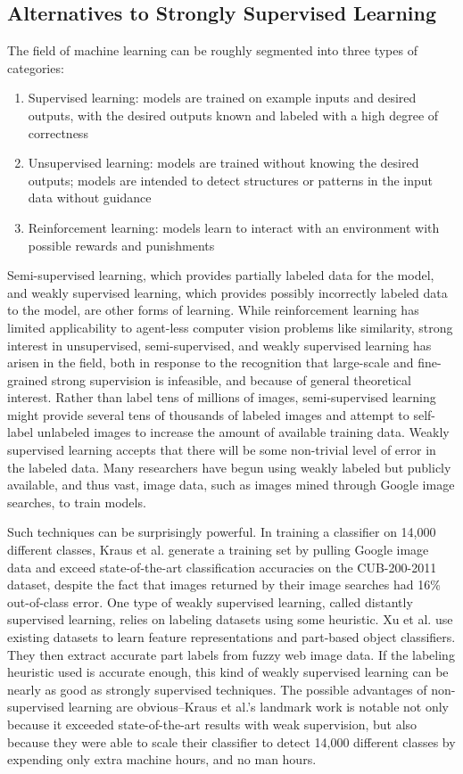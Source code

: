 \subsection{Alternatives to Strongly Supervised Learning}
The field of machine learning can be roughly segmented into three types of categories:
\begin{enumerate}
	\item Supervised learning: models are trained on example inputs and desired outputs, with the desired outputs known and labeled with a high degree of correctness
	\item Unsupervised learning: models are trained without knowing the desired outputs; models are intended to detect structures or patterns in the input data without guidance
	\item Reinforcement learning: models learn to interact with an environment with possible rewards and punishments
\end{enumerate}

Semi-supervised learning, which provides partially labeled data for the model, and weakly supervised learning, which provides possibly incorrectly labeled data to the model, are other forms of learning. While reinforcement learning has limited applicability to agent-less computer vision problems like similarity, strong interest in unsupervised, semi-supervised, and weakly supervised learning has arisen in the field, both in response to the recognition that large-scale and fine-grained strong supervision is infeasible, and because of general theoretical interest. Rather than label tens of millions of images, semi-supervised learning might provide several tens of thousands of labeled images and attempt to self-label unlabeled images to increase the amount of available training data. Weakly supervised learning accepts that there will be some non-trivial level of error in the labeled data. Many researchers have begun using weakly labeled but publicly available, and thus vast, image data, such as images mined through Google image searches, to train models.

Such techniques can be surprisingly powerful. In training a classifier on 14,000 different classes, Kraus et al. generate a training set by pulling Google image data and exceed state-of-the-art classification accuracies on the CUB-200-2011 dataset, despite the fact that images returned by their image searches had 16\% out-of-class error.\cite{krause2016unreasonable} One type of weakly supervised learning, called distantly supervised learning, relies on labeling datasets using some heuristic. Xu et al.\cite{xu2015augmenting} use existing datasets to learn feature representations and part-based object classifiers. They then extract accurate part labels from fuzzy web image data. If the labeling heuristic used is accurate enough, this kind of weakly supervised learning can be nearly as good as strongly supervised techniques. The possible advantages of non-supervised learning are obvious--Kraus et al.'s landmark work is notable not only because it exceeded state-of-the-art results with weak supervision, but also because they were able to scale their classifier to detect 14,000 different classes by expending only extra machine hours, and no man hours.


